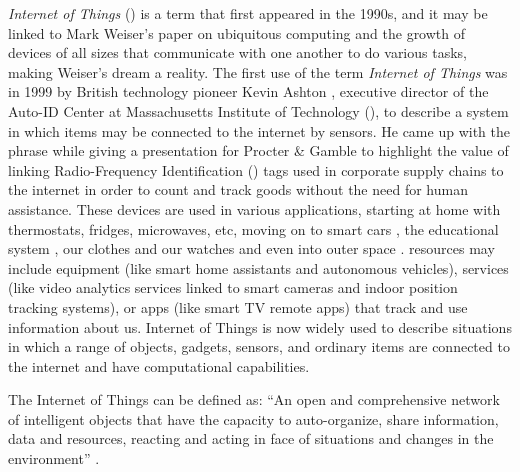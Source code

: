\textit{Internet of Things} (\hyperlink{\acronym}{\acronym}) is a term that first appeared in the 1990s,
and it may be linked to Mark Weiser's paper on ubiquitous computing \cite{weiser1991computer}
and the growth of devices of all sizes that communicate with one another
to do various tasks, making Weiser's dream a reality. The first use of the
term \textit{Internet of Things} was in 1999 by British technology pioneer
Kevin Ashton \cite{KevinThat}, executive director of the Auto-ID Center
at Massachusetts Institute of Technology
(\hyperlink{\acronym}{\acronym}),
to describe a system in
which items may be connected to the internet by sensors. He came up with
the phrase while giving a presentation for Procter \& Gamble to highlight
the value of linking Radio-Frequency Identification (\hyperlink{\acronym}{\acronym}) tags used in
corporate supply chains to the internet in order to count and track goods
without the need for human assistance. These devices are used in various
applications, starting at home \cite{marikyan2019systematic} with thermostats,
fridges, microwaves, etc, moving on to smart cars \cite{arena2020overview},
the educational system \cite{al2020survey}, our clothes and our watches \cite{niknejad2020comprehensive}
and even into outer space \cite{AkyildizInternet}. \hyperlink{\acronym}{\acronym} resources may include
\hyperlink{\acronym}{\acronym} equipment (like smart home assistants and autonomous vehicles), \hyperlink{\acronym}{\acronym}
services (like video analytics services linked to smart cameras and indoor
position tracking systems), or \hyperlink{\acronym}{\acronym} apps (like smart TV remote apps) that
track and use information about us. Internet of Things is now widely used
to describe situations in which a range of objects, gadgets, sensors, and
ordinary items are connected to the internet and have computational capabilities.

The Internet of Things can be defined as: ``An open and comprehensive network
of intelligent objects that have the capacity to auto-organize, share information,
data and resources, reacting and acting in face of situations and changes
in the environment'' \cite{madakam2015internet}.

